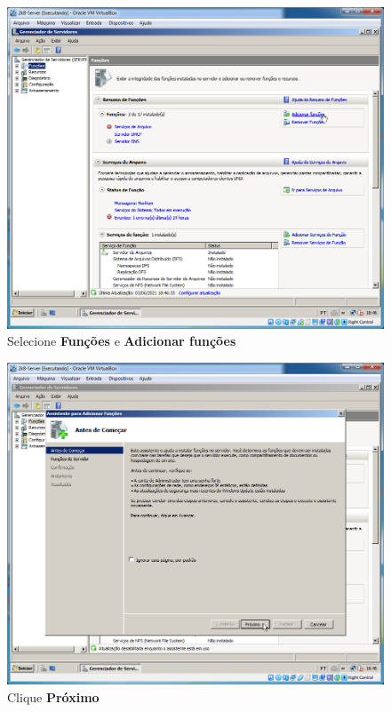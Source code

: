 \documentclass[10pt]{article}
\begin{document}
\begin{figure}[H]
    \centering
    \caption{Selecione \textbf{Funções} e \textbf{Adicionar funções}}
    \label{fig:IIS003}
    \includegraphics[width=\linewidth]{images/IIS/IIS003.png}
\end{figure}
\begin{figure}[H]
    \centering
    \caption{Clique \textbf{Próximo}}
    \label{fig:IIS004}
    \includegraphics[width=\linewidth]{images/IIS/IIS004.png}
\end{figure}
\end{document}
